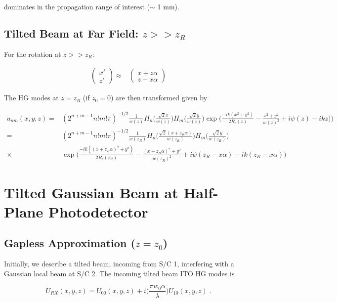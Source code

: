 \documentclass[aps,twoside,secnumarabic,balancelastpage,amsmath,amssymb,nofootinbib,hyperref=pdftex]{revtex4}
\newcommand{\bigfrac}[2]{\Big( \frac{#1}{#2}\Big)}
\begin{document}
dominates in the propagation range of interest ($\sim$ 1 mm).

\clearpage


\subsection{Tilted Beam at Far Field: $z>>z_R$}

For the rotation at $z>>z_R$:
	
	\begin{align*}
\begin{pmatrix}
x' \\
z'
\end{pmatrix} 
 \approx &
	\begin{pmatrix}
x+z\alpha \\
z - x\alpha
\end{pmatrix}
\end{align*}	

The HG modes at $z=z_R$ (if $z_0 = 0$) are then transformed given by

	\begin{align*} 
		u_{nm}(x,y,z)=&(2^{n+m-1}n!m!\pi)^{-1/2}
		\frac{1}{w(z)}H_{n} \Big( \frac{\sqrt{2}x}{w(z)} \Big)
		H_{m} \Big(\frac{\sqrt{2}y}{w(z)} \Big)
		\exp 
		\Big(
		\frac{-ik(x^{2}+y^{2})}{2R_{c}(z)}
		-\frac{x^{2}+y^{2}}{w(z)^{2}} 
		+i \psi(z) - ikz )	
		\Big)
		\\=&
		(2^{n+m-1}n!m!\pi)^{-1/2}
		\frac{1}{w(z_R)}
		H_{n} \Big( \frac{\sqrt{2} (x+z_R \alpha)}{w(z_R)} \Big)
		H_{m} \Big(\frac{\sqrt{2}y}{w(z_R)} \Big)
		\\ \times &		
		\exp 
		\Big(
		\frac{-ik( (x+z_R\alpha)^2 +y^{2})}{2R_{c}(z_R)}
		-\frac{(x+z_R\alpha)^2 +y^{2}}{w(z_R)^{2}} 
		+i \psi(z_R-x\alpha) - ik(z_R-x\alpha)
		\Big)
	\end{align*}

\clearpage

\section{Tilted Gaussian Beam at Half-Plane Photodetector}
\subsection{Gapless Approximation ($z=z_0$)}
Initially, we describe a tilted beam, incoming from S/C 1, interfering with a Gaussian local beam at S/C 2. The incoming tilted beam ITO HG modes is

	\begin{equation} \nonumber
			U_{RX}(x,y,z) 
			= U_{00}(x,y,z) + i  \bigfrac{\pi w_{0} \alpha}{\lambda}U_{10}(x,y,z) \; .
	\end{equation}
\end{document}
